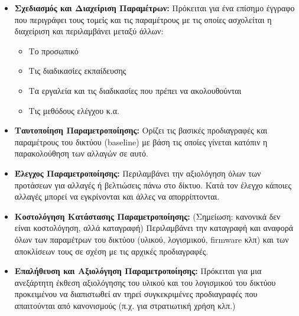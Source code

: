 \begin{itemize}
\item \textbf{Σχεδιασμός και Διαχείριση Παραμέτρων:} Πρόκειται για ένα επίσημο έγγραφο που περιγράφει τους τομείς και τις παραμέτρους με τις οποίες ασχολείται η διαχείριση και περιλαμβάνει μεταξύ άλλων:
\begin{itemize}
\item Το προσωπικό
\item Τις διαδικασίες εκπαίδευσης
\item Τα εργαλεία και τις διαδικασίες που πρέπει να ακολουθούνται
\item Τις μεθόδους ελέγχου κ.α.
\end{itemize}
\item \textbf{Ταυτοποίηση Παραμετροποίησης:} Ορίζει τις βασικές προδιαγραφές και παραμέτρους του δικτύου (baseline) με βάση τις οποίες γίνεται κατόπιν η παρακολούθηση των αλλαγών σε αυτό.
\item \textbf{Έλεγχος Παραμετροποίησης:} Περιλαμβάνει την αξιολόγηση όλων των προτάσεων για αλλαγές ή βελτιώσεις πάνω στο δίκτυο. Κατά τον έλεγχο κάποιες αλλαγές μπορεί να εγκρίνονται και άλλες να απορρίπτονται. 
\item \textbf{Κοστολόγηση Κατάστασης Παραμετροποίησης:} (Σημείωση: κανονικά δεν είναι κοστολόγηση, αλλά καταγραφή) Περιλαμβάνει την καταγραφή και αναφορά όλων των παραμέτρων του δικτύου (υλικού, λογισμικού, firmware κλπ) και των αποκλίσεων τους σε σχέση με τις αρχικές προδιαγραφές. 
\item \textbf{Επαλήθευση και Αξιολόγηση Παραμετροποίησης:} Πρόκειται για μια ανεξάρτητη έκθεση αξιολόγησης του υλικού και του λογισμικού του δικτύου προκειμένου να διαπιστωθεί αν τηρεί συγκεκριμένες προδιαγραφές που απαιτούνται από κανονισμούς (π.χ. για στρατιωτική χρήση κλπ.)
\end{itemize}